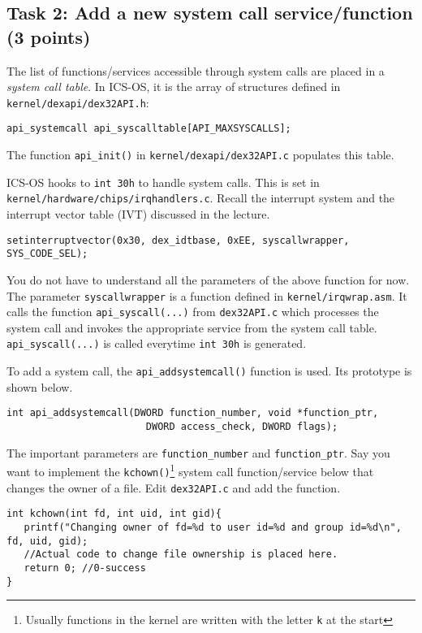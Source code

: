 \documentclass[a4paper, 11pt,oneside]{article}
\begin{document}
\subsection*{Task 2: Add a new system call service/function (3 points)}
The list of functions/services accessible through system calls are placed in a
\textit{system call table}. In ICS-OS, it is the array of structures 
defined in \texttt{kernel/dexapi/dex32API.h}: 

\begin{Verbatim}[frame=single]
api_systemcall api_syscalltable[API_MAXSYSCALLS];
\end{Verbatim}

The function \texttt{api\_init()} in \texttt{kernel/dexapi/dex32API.c}
populates this table. 


ICS-OS hooks to \texttt{int 30h} to handle system calls. This is set in
\texttt{kernel/hardware/chips/irqhandlers.c}. Recall the interrupt system 
and the interrupt vector table (IVT) discussed in the lecture.

\begin{Verbatim}[frame=single] 
setinterruptvector(0x30, dex_idtbase, 0xEE, syscallwrapper, SYS_CODE_SEL); 
\end{Verbatim}

You do not have to understand all the parameters of the above function for now. 
The parameter \texttt{syscallwrapper} is a function defined in \texttt{kernel/irqwrap.asm}.  
It calls the function \texttt{api\_syscall(...)} from \texttt{dex32API.c} 
which processes the system call and invokes the appropriate service from the
system call table. \texttt{api\_syscall(...)} is called everytime \texttt{int 30h} is generated.

To add a system call, the \texttt{api\_addsystemcall()} function is used. Its prototype 
is shown below.
\begin{Verbatim}[frame=single] 
int api_addsystemcall(DWORD function_number, void *function_ptr,
                        DWORD access_check, DWORD flags);
\end{Verbatim}

The important parameters are \texttt{function\_number} and \texttt{function\_ptr}.
Say you want to implement the \texttt{kchown()}\footnote{Usually functions in the kernel are written with the letter \texttt{k} at the start} system call function/service below that changes the owner 
of a file. Edit \texttt{dex32API.c} and add the function.
\begin{Verbatim}[frame=single]
int kchown(int fd, int uid, int gid){
   printf("Changing owner of fd=%d to user id=%d and group id=%d\n", fd, uid, gid);
   //Actual code to change file ownership is placed here.   
   return 0; //0-success
}
\end{Verbatim}
\end{document}
